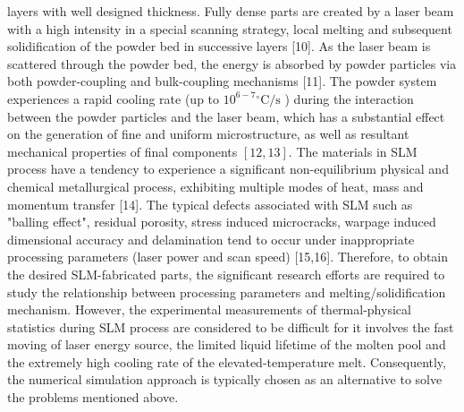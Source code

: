\documentclass[10pt]{article}
\begin{document}
layers with well designed thickness. Fully dense parts are created by a laser beam with a high intensity in a special scanning strategy, local melting and subsequent solidification of the powder bed in successive layers [10]. As the laser beam is scattered through the powder bed, the energy is absorbed by powder particles via both powder-coupling and bulk-coupling mechanisms [11]. The powder system experiences a rapid cooling rate (up to $10^{6-7}{ }^{\circ} \mathrm{C} / \mathrm{s}$ ) during the interaction between the powder particles and the laser beam, which has a substantial effect on the generation of fine and uniform microstructure, as well as resultant mechanical properties of final components $[12,13]$. The materials in SLM process have a tendency to experience a significant non-equilibrium physical and chemical metallurgical process, exhibiting multiple modes of heat, mass and momentum transfer [14]. The typical defects associated with SLM such as "balling effect", residual porosity, stress induced microcracks, warpage induced dimensional accuracy and delamination tend to occur under inappropriate processing parameters (laser power and scan speed) [15,16]. Therefore, to obtain the desired SLM-fabricated parts, the significant research efforts are required to study the relationship between processing parameters and melting/solidification mechanism. However, the experimental measurements of thermal-physical statistics during SLM process are considered to be difficult for it involves the fast moving of laser energy source, the limited liquid lifetime of the molten pool and the extremely high cooling rate of the elevated-temperature melt. Consequently, the numerical simulation approach is typically chosen as an alternative to solve the problems mentioned above.
\end{document}
